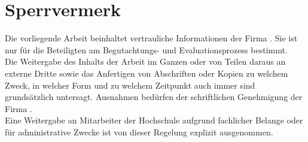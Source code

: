 \section*{Sperrvermerk}
Die vorliegende Arbeit beinhaltet vertrauliche Informationen der Firma \unt. Sie ist nur für die Beteiligten am Begutachtungs- und Evaluationsprozess bestimmt.\\Die Weitergabe des Inhalts der Arbeit im Ganzen oder von Teilen daraus an externe Dritte sowie das Anfertigen von Abschriften oder Kopien zu welchem Zweck, in welcher Form und zu welchem Zeitpunkt auch immer sind grundsätzlich untersagt. Ausnahmen bedürfen der schriftlichen Genehmigung der Firma \unt.\\Eine Weitergabe an Mitarbeiter der Hochschule aufgrund fachlicher Belange oder für administrative Zwecke ist von dieser Regelung explizit ausgenommen.